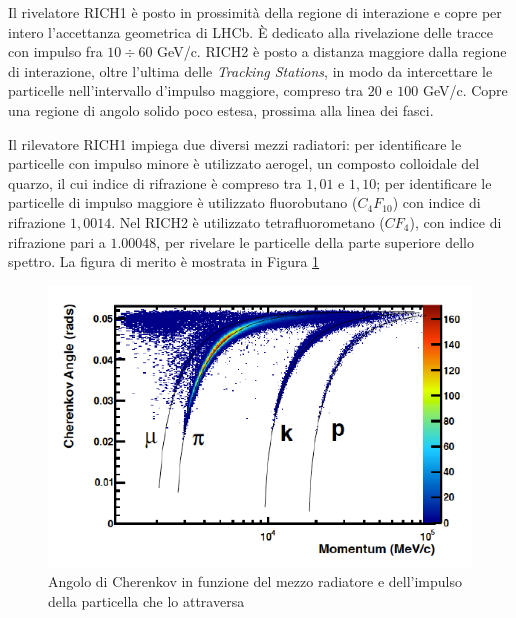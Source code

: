Il rivelatore RICH1 \`e posto in prossimit\`a della regione di interazione e copre per intero l'accettanza geometrica di LHCb. \`E dedicato alla rivelazione delle tracce con impulso fra $10\div60$ GeV/c. 
RICH2 \`e posto a distanza maggiore dalla regione di interazione, oltre l'ultima delle \emph{Tracking Stations}, in modo da intercettare le particelle  nell'intervallo d'impulso maggiore,  compreso tra $20$ e $100$ GeV/c. Copre una regione di angolo solido poco estesa, prossima alla linea dei fasci.

Il rilevatore RICH1 impiega due diversi mezzi radiatori: per identificare le particelle con impulso minore \`e utilizzato aerogel, un composto colloidale del quarzo, il cui indice di rifrazione \`e compreso tra $1,01$ e $1,10$; per identificare le particelle di impulso maggiore \`e utilizzato fluorobutano ($C_4F_{10}$) con indice di rifrazione $1,0014$.
Nel RICH2 \`e utilizzato tetrafluorometano ($CF_4$), con indice di rifrazione pari a $1.00048$, per rivelare le particelle della parte superiore dello spettro. La figura di merito \`e mostrata in Figura \ref{fig:rich2}
\begin{figure}
\centering
\includegraphics[scale=1.2]{Immagini/PastedGraphic-2}
\caption{Angolo di Cherenkov in funzione del mezzo radiatore e dell'impulso della particella che lo attraversa}
\label{fig:rich2}
\end{figure}


